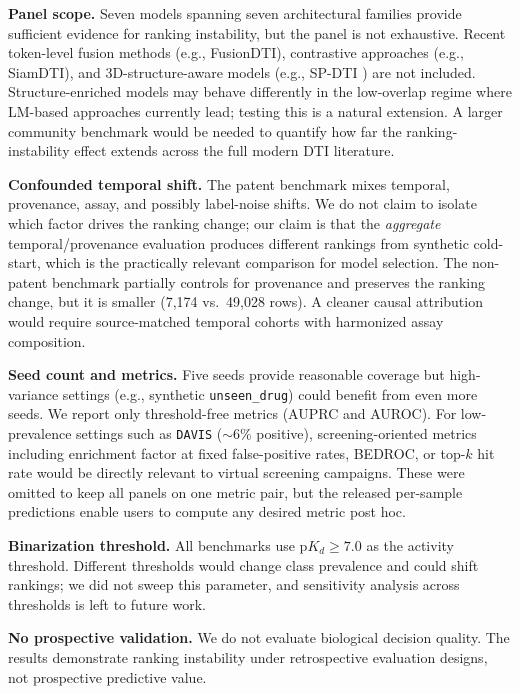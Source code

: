 \documentclass[referee,pdflatex,sn-basic,Numbered]{sn-jnl}
\newcommand{\AUPRC}{AUPRC}
\newcommand{\AUROC}{AUROC}
\begin{document}
\textbf{Panel scope.} Seven models spanning seven architectural families provide sufficient evidence for ranking instability, but the panel is not exhaustive. Recent token-level fusion methods (e.g., FusionDTI), contrastive approaches (e.g., SiamDTI), and 3D-structure-aware models (e.g., SP-DTI \citep{liu2025spdti}) are not included. Structure-enriched models may behave differently in the low-overlap regime where LM-based approaches currently lead; testing this is a natural extension. A larger community benchmark would be needed to quantify how far the ranking-instability effect extends across the full modern DTI literature.

\textbf{Confounded temporal shift.} The patent benchmark mixes temporal, provenance, assay, and possibly label-noise shifts. We do not claim to isolate which factor drives the ranking change; our claim is that the \emph{aggregate} temporal/provenance evaluation produces different rankings from synthetic cold-start, which is the practically relevant comparison for model selection. The non-patent benchmark partially controls for provenance and preserves the ranking change, but it is smaller (7,174 vs.\ 49,028 rows). A cleaner causal attribution would require source-matched temporal cohorts with harmonized assay composition.

\textbf{Seed count and metrics.} Five seeds provide reasonable coverage but high-variance settings (e.g., synthetic \texttt{unseen\_drug}) could benefit from even more seeds. We report only threshold-free metrics (\AUPRC{} and \AUROC{}). For low-prevalence settings such as \texttt{DAVIS} ($\sim$6\% positive), screening-oriented metrics including enrichment factor at fixed false-positive rates, BEDROC, or top-$k$ hit rate would be directly relevant to virtual screening campaigns. These were omitted to keep all panels on one metric pair, but the released per-sample predictions enable users to compute any desired metric post hoc.

\textbf{Binarization threshold.} All benchmarks use $\mathrm{p}K_d \ge 7.0$ as the activity threshold. Different thresholds would change class prevalence and could shift rankings; we did not sweep this parameter, and sensitivity analysis across thresholds is left to future work.

\textbf{No prospective validation.} We do not evaluate biological decision quality. The results demonstrate ranking instability under retrospective evaluation designs, not prospective predictive value.

\end{document}
